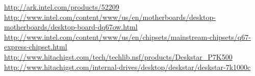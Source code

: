 {}
{}
\begin{thebibliography}{99}
 \url{http://ark.intel.com/products/52209}
 \url{http://www.intel.com/content/www/us/en/motherboards/desktop-motherboards/desktop-board-dq67ow.html}
 \url{http://www.intel.com/content/www/us/en/chipsets/mainstream-chipsets/q67-express-chipset.html}
 \url{http://www.hitachigst.com/tech/techlib.nsf/products/Deskstar_P7K500}
 \url{http://www.hitachigst.com/internal-drives/desktop/deskstar/deskstar-7k1000c}
\end{thebibliography}
